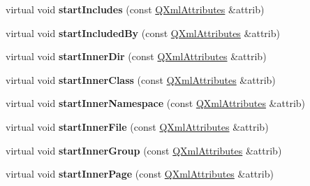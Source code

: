 \begin{DoxyCompactItemize}
\item 
\hypertarget{class_compound_handler_a3eab2f5931842aad8f91a48005110d27}{virtual void {\bfseries start\-Includes} (const \hyperlink{class_q_xml_attributes}{Q\-Xml\-Attributes} \&attrib)}\label{class_compound_handler_a3eab2f5931842aad8f91a48005110d27}

\item 
\hypertarget{class_compound_handler_ac198f1ec6ab472e650ea91aa0886daf1}{virtual void {\bfseries start\-Included\-By} (const \hyperlink{class_q_xml_attributes}{Q\-Xml\-Attributes} \&attrib)}\label{class_compound_handler_ac198f1ec6ab472e650ea91aa0886daf1}

\item 
\hypertarget{class_compound_handler_a28a537b250f8ed2c4f4ae6e39d6e90fa}{virtual void {\bfseries start\-Inner\-Dir} (const \hyperlink{class_q_xml_attributes}{Q\-Xml\-Attributes} \&attrib)}\label{class_compound_handler_a28a537b250f8ed2c4f4ae6e39d6e90fa}

\item 
\hypertarget{class_compound_handler_a0aceb3b3c7a97c1532e98b8af319fc58}{virtual void {\bfseries start\-Inner\-Class} (const \hyperlink{class_q_xml_attributes}{Q\-Xml\-Attributes} \&attrib)}\label{class_compound_handler_a0aceb3b3c7a97c1532e98b8af319fc58}

\item 
\hypertarget{class_compound_handler_ac5a087b01f8f5664a25f1ae45482daea}{virtual void {\bfseries start\-Inner\-Namespace} (const \hyperlink{class_q_xml_attributes}{Q\-Xml\-Attributes} \&attrib)}\label{class_compound_handler_ac5a087b01f8f5664a25f1ae45482daea}

\item 
\hypertarget{class_compound_handler_a99fb925c59508d61cb7b0a14646b253e}{virtual void {\bfseries start\-Inner\-File} (const \hyperlink{class_q_xml_attributes}{Q\-Xml\-Attributes} \&attrib)}\label{class_compound_handler_a99fb925c59508d61cb7b0a14646b253e}

\item 
\hypertarget{class_compound_handler_a8a562c395c5e4db336e04f75980be2cb}{virtual void {\bfseries start\-Inner\-Group} (const \hyperlink{class_q_xml_attributes}{Q\-Xml\-Attributes} \&attrib)}\label{class_compound_handler_a8a562c395c5e4db336e04f75980be2cb}

\item 
\hypertarget{class_compound_handler_a74fb73f08a5aa354b76fa132e8621157}{virtual void {\bfseries start\-Inner\-Page} (const \hyperlink{class_q_xml_attributes}{Q\-Xml\-Attributes} \&attrib)}\label{class_compound_handler_a74fb73f08a5aa354b76fa132e8621157}


\end{DoxyCompactItemize}
